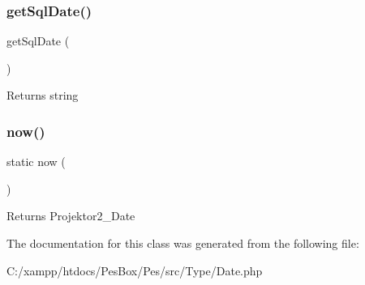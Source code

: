 \subsubsection{\texorpdfstring{get\+Sql\+Date()}{getSqlDate()}}
{\footnotesize\ttfamily get\+Sql\+Date (\begin{DoxyParamCaption}{ }\end{DoxyParamCaption})}

\begin{DoxyReturn}{Returns}
string 
\end{DoxyReturn}
\mbox{\label{class_pes_1_1_type_1_1_date_af1e393aa6d7074ae6ddc34df2ed39c03}} 
\subsubsection{\texorpdfstring{now()}{now()}}
{\footnotesize\ttfamily static now (\begin{DoxyParamCaption}{ }\end{DoxyParamCaption})\hspace{0.3cm}{\ttfamily [static]}}

\begin{DoxyReturn}{Returns}
Projektor2\+\_\+\+Date 
\end{DoxyReturn}


The documentation for this class was generated from the following file\+:\begin{DoxyCompactItemize}
\item 
C\+:/xampp/htdocs/\+Pes\+Box/\+Pes/src/\+Type/Date.\+php\end{DoxyCompactItemize}
